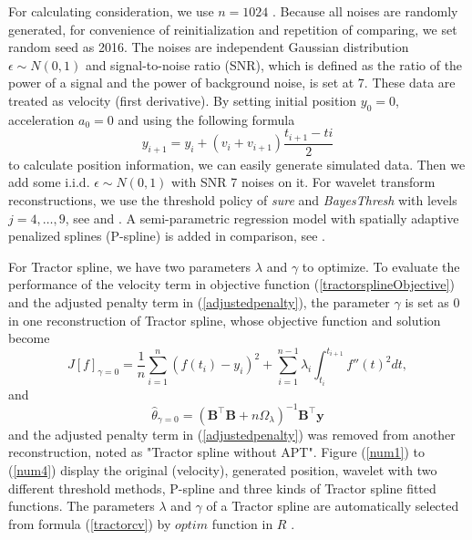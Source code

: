 For calculating consideration, we use $n=1024$ \cite{nason2010wavelet}. Because all noises are randomly generated, for convenience of reinitialization and repetition of comparing, we set random seed as 2016. The noises are independent Gaussian distribution $\epsilon \sim N(0,1)$ and signal-to-noise ratio (SNR), which is defined as the ratio of the power of a signal and the power of background noise, is set at 7. These data are treated as velocity (first derivative). By setting initial position $y_0=0$, acceleration $a_0=0$ and using the following formula 
\begin{equation}
y_{i+1}=y_i+(v_i+v_{i+1})\frac{t_{i+1}-ti}{2}
\end{equation}
to calculate position information, we can easily generate simulated data. Then we add some i.i.d. $\epsilon \sim N(0,1)$ with SNR 7 noises on it. For wavelet transform reconstructions, we use the threshold policy of \textit{sure} and \textit{BayesThresh} with levels $j=4, \ldots, 9$, see  \cite{donoho1995adapting} and \cite{abramovich1998wavelet}. A semi-parametric regression model with spatially adaptive penalized splines (P-spline) is added in comparison, see \cite{krivobokova2008fast} \cite{ruppert2003semiparametric}.

For Tractor spline, we have two parameters $\lambda$ and $\gamma$ to optimize. To evaluate the performance of the velocity term in objective function (\ref{tractorsplineObjective}) and the adjusted penalty term in (\ref{adjustedpenalty}), the parameter $\gamma$ is set as 0 in one reconstruction of Tractor spline, whose objective function and solution become
\begin{equation}\label{ofgamma0}
J[f]_{\gamma=0}= \frac{1}{n} \sum_{i=1}^{n} (f(t_i)-y_i)^2 +\sum_{i=1}^{n-1} \lambda_i\int_{t_i}^{t_{i+1}} f''(t)^2 dt,
\end{equation}
and
\begin{equation}\label{thetahat0}
\hat{\theta}_{\gamma=0}=(\mathbf{B}^\top\mathbf{B}+n\Omega_{\lambda})^{-1}\mathbf{B}^\top\mathbf{y}
\end{equation}
and the adjusted penalty term in (\ref{adjustedpenalty}) was removed from another reconstruction, noted as "Tractor spline without APT". Figure (\ref{num1}) to (\ref{num4}) display the original (velocity), generated position, wavelet with two different threshold methods, P-spline and three kinds of Tractor spline fitted functions. The parameters $\lambda$ and $\gamma$ of a Tractor spline are automatically selected from formula (\ref{tractorcv}) by $\textit{optim}$ function in $R$ \cite{nelder1965simplex}.


